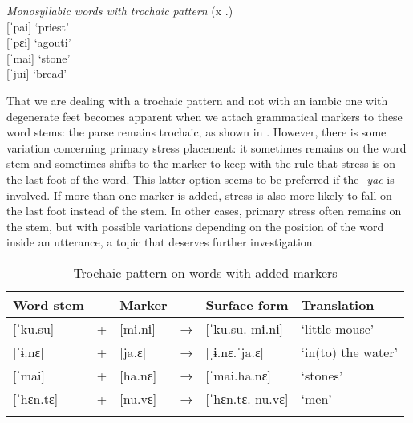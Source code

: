 \ea\label{ex:MonosyllabicWords}
 \textit{Monosyllabic words with trochaic pattern} (x .)\\
    {[}ˈpai] \tab\tab ‘priest’  \\
    {[}ˈpɛi] \tab\tab ‘agouti’  \\
    {[}ˈmai] \tab ‘stone’\\
    {[}ˈjui] \tab\tab ‘bread’\\ %
\xe

That we are dealing with a trochaic pattern and not with an iambic one with degenerate feet becomes apparent when we attach grammatical markers to these word stems: the parse remains trochaic, as shown in . However, there is some variation concerning primary stress placement: it sometimes remains on the word stem and sometimes shifts to the marker to keep with the rule that stress is on the last foot of the word. This latter option seems to be preferred if the  \textit{-yae} is involved. If more than one marker is added, stress is also more likely to fall on the last foot instead of the stem. In other cases, primary stress often remains on the stem, but with possible variations depending on the position of the word inside an utterance, a topic that deserves further investigation.



\begin{table}
\caption{Trochaic pattern on words with added markers}

\begin{tabularx}{\textwidth}{l@{}llCll}
\lsptoprule
Word stem &  & Marker & & Surface form & Translation\\
\midrule
{[}ˈku.su] & + & [mɨ.nɨ] & → & [ˈku.su.ˌmɨ.nɨ] & ‘little mouse’\\
 {[}ˈɨ.nɛ] & + & [ja.ɛ] & → & [ˌɨ.nɛ.ˈja.ɛ] & ‘in(to) the water’\\
{[}ˈmai] & + & [ha.nɛ] & → & [ˈmai.ha.nɛ] & ‘stones’\\
{[}ˈhɛn.tɛ] & + & [nu.vɛ] & → & [ˈhɛn.tɛ.ˌnu.vɛ] & ‘men’\\
\lspbottomrule
\end{tabularx}

\label{table:TrochMarkers}
\end{table}



